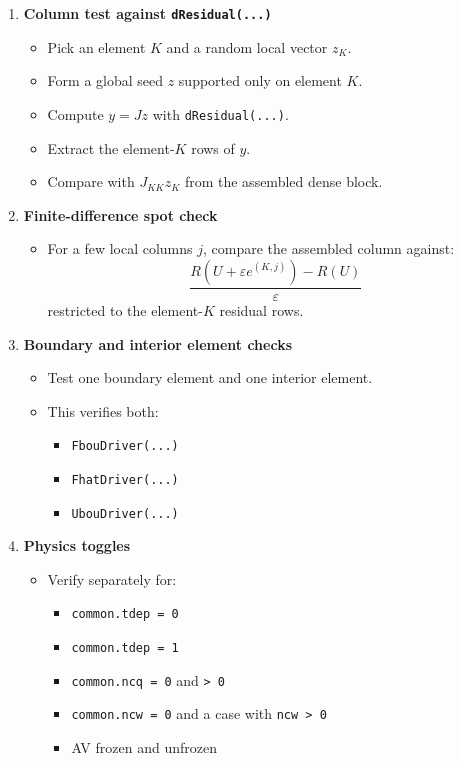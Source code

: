 \documentclass[11pt]{article}
\begin{document}
\begin{enumerate}[leftmargin=*]
\item \textbf{Column test against \texttt{dResidual(...)}}
\begin{itemize}[leftmargin=*]
\item Pick an element $K$ and a random local vector $z_K$.
\item Form a global seed $z$ supported only on element $K$.
\item Compute $y = Jz$ with \texttt{dResidual(...)}.
\item Extract the element-$K$ rows of $y$.
\item Compare with $J_{KK} z_K$ from the assembled dense block.
\end{itemize}

\item \textbf{Finite-difference spot check}
\begin{itemize}[leftmargin=*]
\item For a few local columns $j$, compare the assembled column against:
\[
\frac{R(U + \varepsilon e^{(K,j)}) - R(U)}{\varepsilon}
\]
restricted to the element-$K$ residual rows.
\end{itemize}

\item \textbf{Boundary and interior element checks}
\begin{itemize}[leftmargin=*]
\item Test one boundary element and one interior element.
\item This verifies both:
\begin{itemize}[leftmargin=*]
\item \texttt{FbouDriver(...)}
\item \texttt{FhatDriver(...)}
\item \texttt{UbouDriver(...)}
\end{itemize}
\end{itemize}

\item \textbf{Physics toggles}
\begin{itemize}[leftmargin=*]
\item Verify separately for:
\begin{itemize}[leftmargin=*]
\item \texttt{common.tdep = 0}
\item \texttt{common.tdep = 1}
\item \texttt{common.ncq = 0} and \texttt{> 0}
\item \texttt{common.ncw = 0} and a case with \texttt{ncw > 0}
\item AV frozen and unfrozen
\end{itemize}
\end{itemize}


\end{enumerate}
\end{document}
